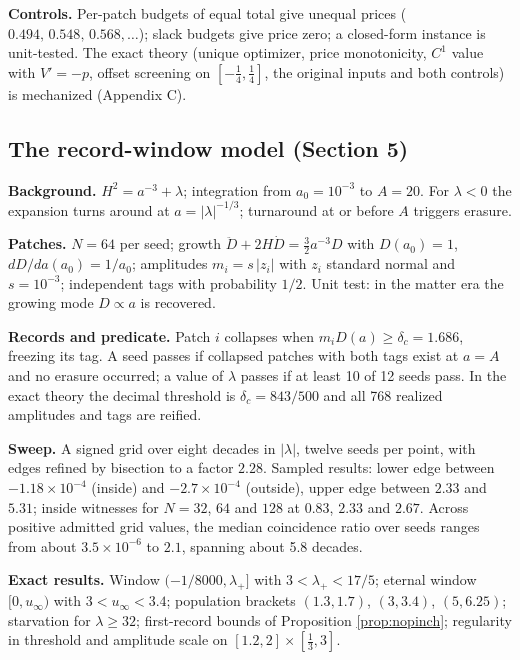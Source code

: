 \textbf{Controls.} Per-patch budgets of equal total give unequal prices
(\(0.494,\,0.548,\,0.568,\ldots\)); slack budgets give price zero; a
closed-form instance is unit-tested. The exact theory (unique optimizer,
price monotonicity, \(C^1\) value with \(V'=-p\), offset screening on
\([-\tfrac14,\tfrac14]\), the original inputs and both controls) is
mechanized (Appendix C).

\hypertarget{a.2-the-record-window-model-section-5}{%
\subsection{The record-window model (Section
5)}\label{a.2-the-record-window-model-section-5}}

\textbf{Background.} \(H^2=a^{-3}+\lambda\); integration from
\(a_0=10^{-3}\) to \(A=20\). For \(\lambda<0\) the expansion turns
around at \(a=|\lambda|^{-1/3}\); turnaround at or before \(A\) triggers
erasure.

\textbf{Patches.} \(N=64\) per seed; growth
\(\ddot D+2H\dot D=\tfrac32a^{-3}D\) with \(D(a_0)=1\),
\(dD/da(a_0)=1/a_0\); amplitudes \(m_i=s\,|z_i|\) with \(z_i\) standard
normal and \(s=10^{-3}\); independent tags with probability \(1/2\).
Unit test: in the matter era the growing mode \(D\propto a\) is
recovered.

\textbf{Records and predicate.} Patch \(i\) collapses when
\(m_iD(a)\ge\delta_c=1.686\), freezing its tag. A seed passes if
collapsed patches with both tags exist at \(a=A\) and no erasure
occurred; a value of \(\lambda\) passes if at least 10 of 12 seeds pass.
In the exact theory the decimal threshold is \(\delta_c=843/500\) and
all 768 realized amplitudes and tags are reified.

\textbf{Sweep.} A signed grid over eight decades in \(|\lambda|\),
twelve seeds per point, with edges refined by bisection to a factor
\(2.28\). Sampled results: lower edge between \(-1.18\times10^{-4}\)
(inside) and \(-2.7\times10^{-4}\) (outside), upper edge between
\(2.33\) and \(5.31\); inside witnesses for \(N=32\), \(64\) and \(128\)
at \(0.83\), \(2.33\) and \(2.67\). Across positive admitted grid
values, the median coincidence ratio over seeds ranges from about
\(3.5\times10^{-6}\) to \(2.1\), spanning about 5.8 decades.

\textbf{Exact results.} Window \((-1/8000,\lambda_+]\) with
\(3<\lambda_+<17/5\); eternal window \([0,u_\infty)\) with
\(3<u_\infty<3.4\); population brackets \((1.3,1.7)\), \((3,3.4)\),
\((5,6.25)\); starvation for \(\lambda\ge32\); first-record bounds of
Proposition \ref{prop:nopinch}; regularity in threshold and amplitude
scale on \([1.2,2]\times[\tfrac13,3]\).

